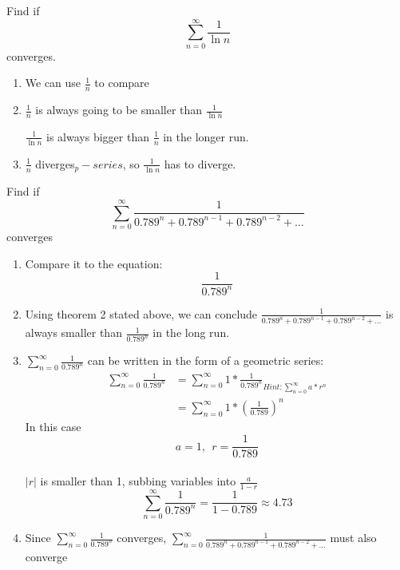 	\begin{example}{}{}
	Find if
	$$\sum^\infty_{n=0}\frac{1}{\ln{n}}$$
	converges.
	
	\begin{enumerate}
	    \item We can use $\frac{1}{n}$ to compare
	    \item $\frac{1}{n}$ is always going to be smaller than $\frac{1}{\ln{n}}$
	    \begin{center}
	    \end{center}
	    
	    \noindent $\frac{1}{\ln{n}}$ is always bigger than $\frac{1}{n}$ in the longer run.
	    
	    \item $\frac{1}{n}$ diverges$_p-series$, so $\frac{1}{\ln{n}}$ has to diverge.
	\end{enumerate}
	\end{example}
	
	\begin{example}{}{}
	Find if
	$$\sum^\infty_{n=0}\frac{1}{0.789^n+0.789^{n-1}+0.789^{n-2}+\ldots{}}$$
	converges
	\begin{enumerate}
	    \item Compare it to the equation:
	    $$\frac{1}{0.789^n}$$
	    \item Using theorem 2 stated above, we can conclude $\frac{1}{0.789^n+0.789^{n-1}+0.789^{n-2}+\ldots{}}$ is always smaller than $\frac{1}{0.789^n}$ in the long run.
	    \item $\displaystyle\sum^\infty_{n=0}\frac{1}{0.789^n}$ can be written in the form of a geometric series: 
	    \begin{align*}
	        \sum^\infty_{n=0}\frac{1}{0.789^n}&=\sum^\infty_{n=0}1*\frac{1}{0.789^n}_{Hint: \sum^\infty_{n=0}a*r^n}\\
	        &=\sum^\infty_{n=0}1*\left(\frac{1}{0.789}\right)^n
	    \end{align*}
	    In this case $$a=1,\ \ r=\frac{1}{0.789}$$\\
	    $|r|$ is smaller than 1, subbing variables into $\displaystyle\frac{a}{1-r}$
	    $$\sum^\infty_{n=0}\frac{1}{0.789^n}=\frac{1}{1-0.789}\approx4.73$$
	    
	    \item Since $\sum^\infty_{n=0}\frac{1}{0.789^n}$ converges, $\sum^\infty_{n=0}\frac{1}{0.789^n+0.789^{n-1}+0.789^{n-2}+\ldots{}}$ must also converge
	\end{enumerate}
	\end{example}
	

